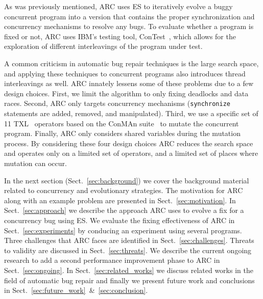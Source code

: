 As was previously mentioned, ARC uses ES to iteratively evolve a buggy concurrent program into a version that contains the proper synchronization and concurrency mechanisms to resolve any bugs. To evaluate
whether a program is fixed or not, ARC uses IBM's testing tool,
ConTest~\cite{EFN+02}, which allows for the exploration of different interleavings of
the program under test.

A common criticism in automatic bug repair techniques is the large search space, and applying these techniques to  concurrent programs also introduces thread interleavings as well.
ARC innately lessens some of these problems due to a few design choices. First,
we limit the algorithm to only fixing deadlocks and data races. Second, ARC
only targets concurrency mechanisms (\texttt{synchronize} statements are added,
removed, and manipulated). Third, we use a specific set of 11 TXL~\cite{CHP91}
operators based on the ConMAn suite~\cite{BCD06} to mutate the concurrent
program.  Finally, ARC only considers shared variables during the mutation
process. By considering these four design choices ARC reduces the search space and operates only on a limited set
of operators, and a limited set of places where mutation can occur.

In the next section (Sect.~\ref{sec:background}) we cover the background material related to concurrency and evolutionary strategies. The motivation for ARC along with an example
problem are presented in Sect.~\ref{sec:motivation}. In
Sect.~\ref{sec:approach} we describe the approach ARC uses to evolve a fix for
a concurrency bug using ES. We evaluate the fixing effectiveness of ARC in
Sect.~\ref{sec:experiments} by conducing an experiment using several programs.
Three challenges that ARC faces are identified in Sect.~\ref{sec:challenges}.
Threats to validity are discussed in Sect.~\ref{sec:threats}. We describe the
current ongoing research to add a second performance improvement phase to ARC in Sect.~\ref{sec:ongoing}. In
Sect.~\ref{sec:related_works} we discuss related works in the field of
automatic bug repair and finally we present future work and conclusions in
Sect.~\ref{sec:future_work}~\&~\ref{sec:conclusion}.


